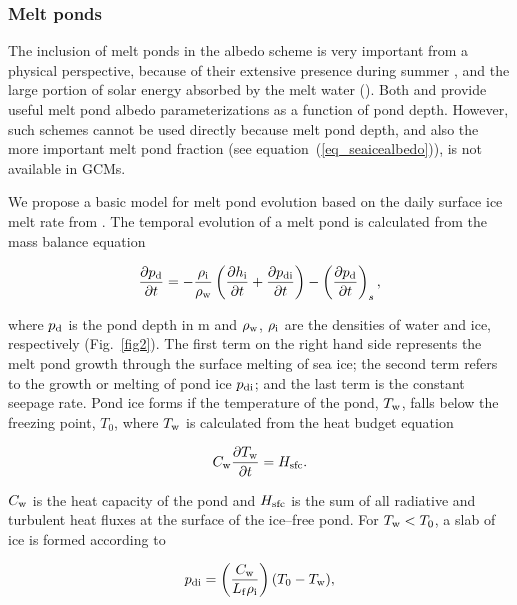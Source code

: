 \subsubsection{Melt ponds}\label{sec_meltpond}

The inclusion of melt ponds in the albedo scheme is very important
from a physical perspective, because of their extensive presence
during summer \cite{perovich2002, tschudi2001, fetterer1998, perovich1997}, and
the large portion of solar energy absorbed by the melt water
(\cite{podgorny1996}). 
Both \cite{schramm1997} and \cite{morassutti1996} provide useful melt pond
albedo parameterizations as a function of pond depth. However, such
schemes cannot be used directly because melt pond depth, and also the
more important melt pond fraction (see
equation~(\ref{eq_seaicealbedo})), is not available in GCMs.

We propose a basic model for melt pond evolution based on the daily
surface ice melt rate from \echam. The temporal evolution of a melt
pond is calculated from the mass balance equation

\begin{equation}\label{eq_massbalance}
\frac{\partial p_{\rm d}}{\partial t} = -\frac{\rho_{\rm i}}{\rho_{\rm
    w}}
\left(\frac{\partial h_{\rm i}}{\partial t}+\frac{\partial p_{\rm
    di}}{\partial t}\right)-\left(\frac{\partial p_{\rm d}}{\partial
  t}\right)_s,
\end{equation}

where $p_{\rm d}$ is the pond depth in m and $\rho_{\rm w}$, $\rho_{\rm
  i}$ are the densities of water and ice, respectively
(Fig.~\ref{fig2}). The first term on the right hand side represents the
melt pond growth through the surface melting of sea ice; the second
term refers to the growth or melting of pond ice $p_{\rm di}$; and the
last term is the constant seepage rate. Pond ice forms if the
temperature of the pond, $T_{\rm w}$, falls below the freezing point,
$T_0$, where $T_{\rm w}$ is calculated from the heat budget equation

\begin{equation}
C_{\rm w}\frac{\partial T_{\rm w}}{\partial t}=H_{\rm sfc}.
\end{equation}

$C_{\rm w}$ is the heat capacity of the pond and $H_{\rm sfc}$ is the
sum of all radiative and turbulent heat fluxes at the surface of the
ice--free pond. For $T_{\rm w} < T_0$, a slab of ice is formed
according to 

\begin{equation}
p_{\rm di} = \left(\frac{C_{\rm w}}{L_{\rm f}\rho_{\rm
      i}}\right)(T_0-T_{\rm w}),
\end{equation}

